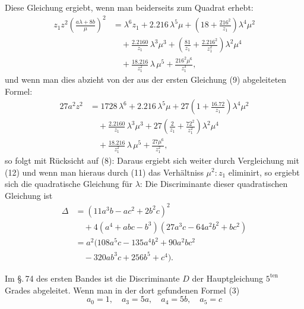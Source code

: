 Diese Gleichung ergiebt, wenn man beiderseits zum Quadrat erhebt:
\[
\begin{aligned}
z_1 z^2\left(\frac{a\lambda+8b}{\mu}\right)^2 &= \lambda^6 z_1 + 2.216\,\lambda^5\mu + \left(18+\frac{216^2}{z_1}\right)\lambda^4\mu^2 \\
&\quad + \frac{2.2160}{z_1}\,\lambda^3\mu^3 + \left(\frac{81}{z_1}+\frac{2.216^2}{z_1^2}\right)\lambda^2\mu^4 \\
&\quad + \frac{18.216}{z_1^2}\,\lambda\,\mu^5 + \frac{216^2\mu^6}{z_1^3},
\end{aligned}
\]
und wenn man dies abzieht von der aus der ersten Gleichung (9) abgeleiteten Formel:
\[
\begin{aligned}
27a^2z^2 &= 1728\,\lambda^6 + 2.216\,\lambda^5\mu + 27\left(1+\frac{16.72}{z_1}\right)\lambda^4\mu^2 \\
&\quad + \frac{2.2160}{z_1}\,\lambda^3\mu^3 + 27\left(\frac{2}{z_1}+\frac{72^2}{z_1^2}\right)\lambda^2\mu^4 \\
&\quad + \frac{18.216}{z_1^2}\,\lambda\,\mu^5 + \frac{27\mu^6}{z_1^2},
\end{aligned}
\]
so folgt mit R\"ucksicht auf (8):
Daraus ergiebt sich weiter durch Vergleichung mit (12)
und wenn man hieraus durch (11) das Verh\"altniss $\mu^2:z_1$ eliminirt, so ergiebt sich die quadratische Gleichung f\"ur $\lambda$:
Die Discriminante dieser quadratischen Gleichung ist
\[
\begin{aligned}
\Delta &= (11a^3b - ac^2 + 2b^2c)^2 \\
&\quad + 4(a^4+abc-b^3)(27a^3c - 64a^2b^2 + bc^2) \\
&= a^2(108a^5c - 135a^4b^2 + 90a^2bc^2 \\
&\quad - 320ab^3c + 256b^5 + c^4).
\end{aligned}
\]

Im \S.\,74 des ersten Bandes ist die Discriminante $D$ der Hauptgleichung $5^{\mathrm{ten}}$ Grades abgeleitet. Wenn man in der dort gefundenen Formel (3)
\[
a_0=1,\quad a_3=5a,\quad a_4=5b,\quad a_5=c
\]
